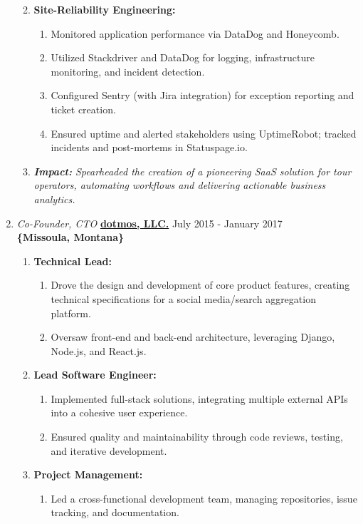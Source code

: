 \documentclass[oneside]{article}%
\begin{document}
\begin{enumerate}[]
\begin{enumerate}[]
\begin{enumerate}[-]
				\end{enumerate}
			\item \textbf{Site-Reliability Engineering:}
				\begin{enumerate}[-]
					\item Monitored application performance via DataDog and Honeycomb.
					\item Utilized Stackdriver and DataDog for logging, infrastructure monitoring, and incident detection.
					\item Configured Sentry (with Jira integration) for exception reporting and ticket creation.
					\item Ensured uptime and alerted stakeholders using UptimeRobot; tracked incidents and post-mortems in Statuspage.io.
				\end{enumerate}
			\item \textit{\textbf{Impact:} Spearheaded the creation of a pioneering SaaS solution for tour operators, 
automating workflows and delivering actionable business analytics.}
		\end{enumerate}
	\item \textit{Co-Founder, CTO} \textbf{\href{https://dotmos.com}{dotmos, LLC.}} \hfill July 2015 - January 2017\\
		\textbf{\{Missoula, Montana\}}
		\begin{enumerate}[]
			\item \textbf{Technical Lead:}
				\begin{enumerate}[-]
					\item Drove the design and development of core product features, creating technical specifications for a social media/search aggregation platform.
					\item Oversaw front-end and back-end architecture, leveraging Django, Node.js, and React.js.
				\end{enumerate}
			\item \textbf{Lead Software Engineer:}
				\begin{enumerate}[-]
					\item Implemented full-stack solutions, integrating multiple external APIs into a cohesive user experience.
					\item Ensured quality and maintainability through code reviews, testing, and iterative development.
				\end{enumerate}
			\item \textbf{Project Management:}
				\begin{enumerate}[-]
					 \item Led a cross-functional development team, managing repositories, issue tracking, and documentation.

\end{enumerate}
\end{enumerate}
\end{enumerate}
\end{document}
